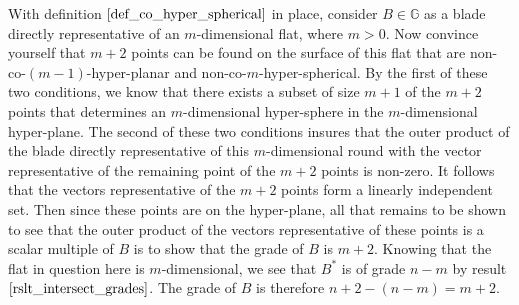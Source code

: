 \documentclass[12pt]{article}
\newcommand{\G}{\mathbb{G}}
\begin{document}
With definition $\eqref{def_co_hyper_spherical}$ in place, consider $B\in\G$ as a blade directly representative
of an $m$-dimensional flat, where $m>0$.  Now convince yourself that $m+2$ points can
be found on the surface of this flat that are non-co-$(m-1)$-hyper-planar
and non-co-$m$-hyper-spherical.  By the first of these two conditions,
we know that there exists a subset of size $m+1$ of the $m+2$ points that
determines an $m$-dimensional hyper-sphere in the $m$-dimensional hyper-plane.
The second of these two conditions insures that the outer product
of the blade directly representative of this $m$-dimensional round
with the vector representative of the remaining point of the $m+2$
points is non-zero.  It follows that the vectors representative
of the $m+2$ points form a linearly independent set.  Then since
these points are on the hyper-plane, all that remains to be shown
to see that the outer product of the vectors representative of these
points is a scalar multiple of $B$ is to show that the grade of $B$ is $m+2$.
Knowing that the flat in question here is $m$-dimensional, we see that $B^*$
is of grade $n-m$ by result $\eqref{rslt_intersect_grades}$.
The grade of $B$ is therefore $n+2-(n-m)=m+2$.
\end{document}
